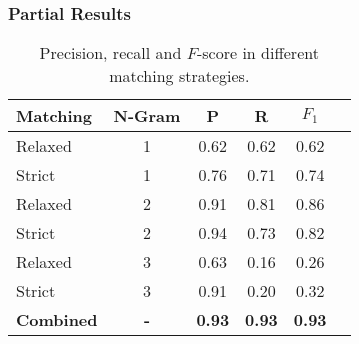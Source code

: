 

\begin{frame}
	\frametitle{Partial Results\footnotemark}
\begin{table}[htbp]
    	\footnotesize
	\caption{Precision, recall and $F$-score in different matching strategies.}
	\myfloatalign
    \begin{tabular}{lccccc}
    \toprule
	{\bf Matching} & {\bf N-Gram} &  {\bf P} & {\bf R} & {\bf $F_1$} \\
	\midrule
	Relaxed & 1 & 0.62 & 0.62 & 0.62 \\
	Strict & 1 & 0.76 & 0.71 & 0.74 \\
	Relaxed & 2 & 0.91 & 0.81 & 0.86 \\
	Strict & 2 & 0.94 & 0.73 & 0.82 \\
	Relaxed & 3 & 0.63 & 0.16 & 0.26 \\
	Strict & 3 & 0.91 & 0.20 & 0.32 \\
	\midrule
	{\bf Combined} & {\bf -} & {\bf 0.93} & {\bf 0.93} & {\bf 0.93} \\
	\bottomrule
    \end{tabular}
  \label{tab:abbreviation_metrics}
\end{table}
\end{frame}


